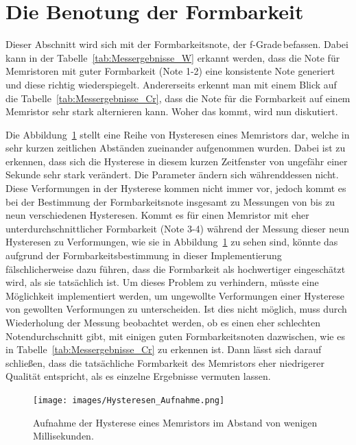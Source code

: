 \section{Die Benotung der Formbarkeit}
Dieser Abschnitt wird sich mit der Formbarkeitsnote, der \glqq f-Grade\grqq\,befassen. Dabei kann in der Tabelle~\ref{tab:Messergebnisse_W} erkannt werden, dass die Note für Memristoren mit guter Formbarkeit (Note 1-2) eine konsistente Note generiert und diese richtig wiederspiegelt. Andererseits erkennt man mit einem Blick auf die Tabelle~\ref{tab:Messergebnisse_Cr}, dass die Note für die Formbarkeit auf einem Memristor sehr stark alternieren kann. Woher das kommt, wird nun diskutiert.

Die Abbildung~\ref{fig:Hysteresen_Veränderung} stellt eine Reihe von Hysteresen eines Memristors dar, welche in sehr kurzen zeitlichen Abständen zueinander aufgenommen wurden. Dabei ist zu erkennen, dass sich die Hysterese in diesem kurzen Zeitfenster von ungefähr einer Sekunde sehr stark verändert. Die Parameter ändern sich währenddessen nicht.  Diese Verformungen in der Hysterese kommen nicht immer vor, jedoch kommt es bei der Bestimmung der Formbarkeitsnote insgesamt zu Messungen von bis zu neun verschiedenen Hysteresen. Kommt es für einen Memristor mit eher unterdurchschnittlicher Formbarkeit (Note 3-4) während der Messung dieser neun Hysteresen zu Verformungen, wie sie in Abbildung~\ref{fig:Hysteresen_Veränderung} zu sehen sind, könnte das aufgrund der Formbarkeitsbestimmung in dieser Implementierung fälschlicherweise dazu führen, dass die Formbarkeit als hochwertiger eingeschätzt wird, als sie tatsächlich ist. Um dieses Problem zu verhindern, müsste eine Möglichkeit implementiert werden, um ungewollte Verformungen einer Hysterese von gewollten Verformungen zu unterscheiden. Ist dies nicht möglich, muss durch Wiederholung der Messung beobachtet werden, ob es einen eher schlechten Notendurchschnitt gibt, mit einigen guten Formbarkeitsnoten dazwischen, wie es in Tabelle~\ref{tab:Messergebnisse_Cr} zu erkennen ist. Dann lässt sich darauf schließen, dass die tatsächliche Formbarkeit des Memristors eher niedrigerer Qualität entspricht, als es einzelne Ergebnisse vermuten lassen.

\begin{figure}
  \centering
    \texttt{[image: images/Hysteresen\_Aufnahme.png]}
  \caption{Aufnahme der Hysterese eines Memristors im Abstand von wenigen Millisekunden.}
  \label{fig:Hysteresen_Veränderung}
\end{figure}

